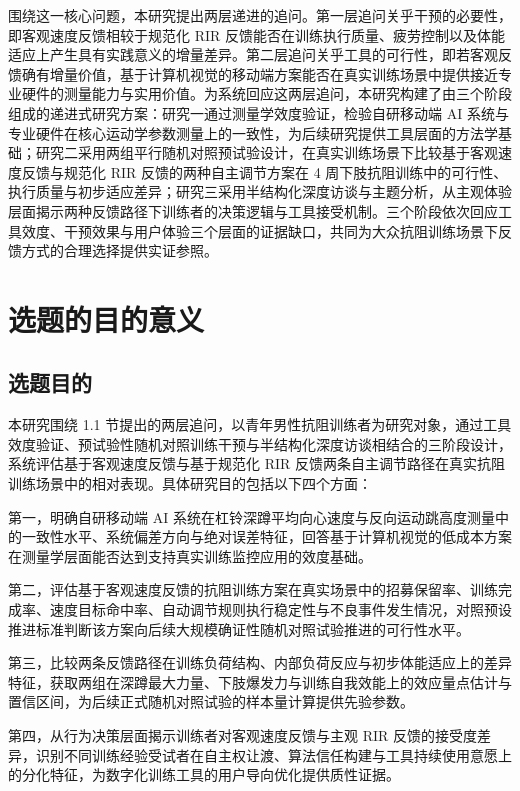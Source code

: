 \documentclass[UTF8,zihao=-4,twoside,openany]{ctexbook}
\begin{document}
围绕这一核心问题，本研究提出两层递进的追问。第一层追问关乎干预的必要性，即客观速度反馈相较于规范化 RIR 反馈能否在训练执行质量、疲劳控制以及体能适应上产生具有实践意义的增量差异。第二层追问关乎工具的可行性，即若客观反馈确有增量价值，基于计算机视觉的移动端方案能否在真实训练场景中提供接近专业硬件的测量能力与实用价值。为系统回应这两层追问，本研究构建了由三个阶段组成的递进式研究方案：研究一通过测量学效度验证，检验自研移动端 AI 系统与专业硬件在核心运动学参数测量上的一致性，为后续研究提供工具层面的方法学基础；研究二采用两组平行随机对照预试验设计，在真实训练场景下比较基于客观速度反馈与规范化 RIR 反馈的两种自主调节方案在 4 周下肢抗阻训练中的可行性、执行质量与初步适应差异；研究三采用半结构化深度访谈与主题分析，从主观体验层面揭示两种反馈路径下训练者的决策逻辑与工具接受机制。三个阶段依次回应工具效度、干预效果与用户体验三个层面的证据缺口，共同为大众抗阻训练场景下反馈方式的合理选择提供实证参照。

\section{选题的目的意义}

\subsection{选题目的}
本研究围绕 1.1 节提出的两层追问，以青年男性抗阻训练者为研究对象，通过工具效度验证、预试验性随机对照训练干预与半结构化深度访谈相结合的三阶段设计，系统评估基于客观速度反馈与基于规范化 RIR 反馈两条自主调节路径在真实抗阻训练场景中的相对表现。具体研究目的包括以下四个方面：

第一，明确自研移动端 AI 系统在杠铃深蹲平均向心速度与反向运动跳高度测量中的一致性水平、系统偏差方向与绝对误差特征，回答基于计算机视觉的低成本方案在测量学层面能否达到支持真实训练监控应用的效度基础。

第二，评估基于客观速度反馈的抗阻训练方案在真实场景中的招募保留率、训练完成率、速度目标命中率、自动调节规则执行稳定性与不良事件发生情况，对照预设推进标准判断该方案向后续大规模确证性随机对照试验推进的可行性水平。

第三，比较两条反馈路径在训练负荷结构、内部负荷反应与初步体能适应上的差异特征，获取两组在深蹲最大力量、下肢爆发力与训练自我效能上的效应量点估计与置信区间，为后续正式随机对照试验的样本量计算提供先验参数。

第四，从行为决策层面揭示训练者对客观速度反馈与主观 RIR 反馈的接受度差异，识别不同训练经验受试者在自主权让渡、算法信任构建与工具持续使用意愿上的分化特征，为数字化训练工具的用户导向优化提供质性证据。
\end{document}
